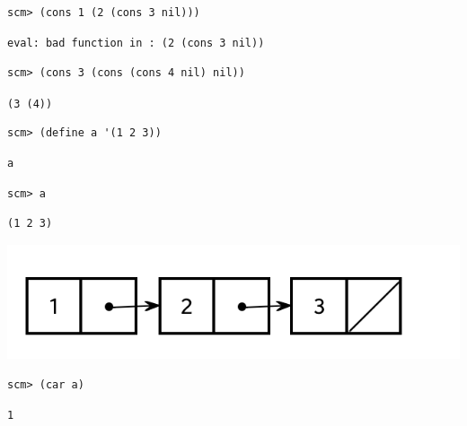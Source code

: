 \begin{lstlisting}
scm> (cons 1 (2 (cons 3 nil)))
\end{lstlisting}
\begin{solution}[.25in]
\begin{lstlisting}
eval: bad function in : (2 (cons 3 nil))
\end{lstlisting}
\end{solution}

\begin{lstlisting}
scm> (cons 3 (cons (cons 4 nil) nil))
\end{lstlisting}

\begin{solution}[.5in]
\lstinline$(3 (4))$
\end{solution}

\begin{lstlisting}
scm> (define a '(1 2 3))
\end{lstlisting}
\begin{solution}[.25in]
\begin{lstlisting}
a
\end{lstlisting}
\end{solution}

\begin{lstlisting}
scm> a
\end{lstlisting}
\begin{solution}[.25in]
\begin{lstlisting}
(1 2 3)
\end{lstlisting}
\includegraphics[scale=0.7]{scheme_lists_6}
\end{solution}

\begin{lstlisting}
scm> (car a)
\end{lstlisting}
\begin{solution}[.25in]
\begin{lstlisting}
1
\end{lstlisting}
\end{solution}

